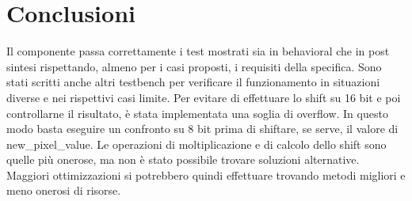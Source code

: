\documentclass{article}
\begin{document}
\pagebreak

\section{Conclusioni}
Il componente passa correttamente i test mostrati sia in behavioral che in post sintesi rispettando, almeno per i casi proposti, i requisiti della specifica. Sono stati scritti anche altri testbench per verificare il funzionamento in situazioni diverse e nei rispettivi casi limite. Per evitare di effettuare lo shift su 16 bit e poi controllarne il risultato, è stata implementata una soglia di overflow. In questo modo basta eseguire un confronto su 8 bit prima di shiftare, se serve, il valore di new\_pixel\_value. Le operazioni di moltiplicazione e di calcolo dello shift sono quelle più onerose, ma non è stato possibile trovare soluzioni alternative. Maggiori ottimizzazioni si potrebbero quindi effettuare trovando metodi migliori e meno onerosi di risorse.

\printbibliography
\end{document}
